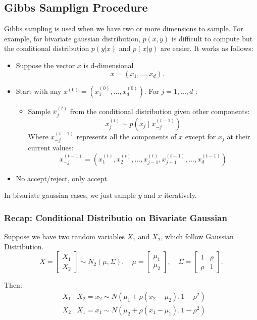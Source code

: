 \subsection{Gibbs Samplign Procedure}
Gibbs sampling is used when we have two or more dimensions to sample. For example, for bivariate gaussian distribution, $p(x,y)$ is difficult to compute but the conditional distribution $p(y|x)$ and $p(x|y)$ are easier. It works as follows:
\begin{itemize}
    \item Suppose the vector $x$ is d-dimensional
    $$
    x=\left(x_1, \ldots, x_d\right) .
    $$
    \item Start with any $x^{(0)}=\left(x_1^{(0)}, \ldots, x_d^{(0)}\right)$. For $j=1, \ldots, d$ :
    \begin{itemize}
        \item Sample $x_j^{(t)}$ from the conditional distribution given other components:
        $$
        x_j^{(t)} \sim p\left(x_j \mid x_{-j}^{(t-1)}\right)
        $$
        Where $x_{-j}^{(t-1)}$ represents all the components of $x$ except for $x_j$ at their current values:
        $$
        x_{-j}^{(t-1)}=\left(x_1^{(t)}, x_2^{(t)}, \ldots, x_{j-1}^{(t)}, x_{j+1}^{(t-1)}, \ldots, x_d^{(t-1)}\right)
        $$
    \end{itemize}
   
    \item No accept/reject, only accept.
\end{itemize}
In bivariate gaussian cases, we just sample $y$ and $x$ iteratively.
\subsubsection*{Recap: Conditional Distributio on Bivariate Gaussian}
Suppose we have two random variables $X_1$ and $X_2$, which follow Gaussian Distribution.
$$
X=\left[\begin{array}{l}
X_1 \\
X_2
\end{array}\right] \sim N_2(\mu, \Sigma), \quad \mu=\left[\begin{array}{l}
\mu_1 \\
\mu_2
\end{array}\right], \quad \Sigma=\left[\begin{array}{ll}
1 & \rho \\
\rho & 1
\end{array}\right] .
$$

Then:
$$
\begin{aligned}
& X_1 \mid X_2=x_2 \sim N\left(\mu_1+\rho\left(x_2-\mu_2\right), 1-\rho^2\right) \\
& X_2 \mid X_1=x_1 \sim N\left(\mu_2+\rho\left(x_1-\mu_1\right), 1-\rho^2\right)
\end{aligned}
$$


